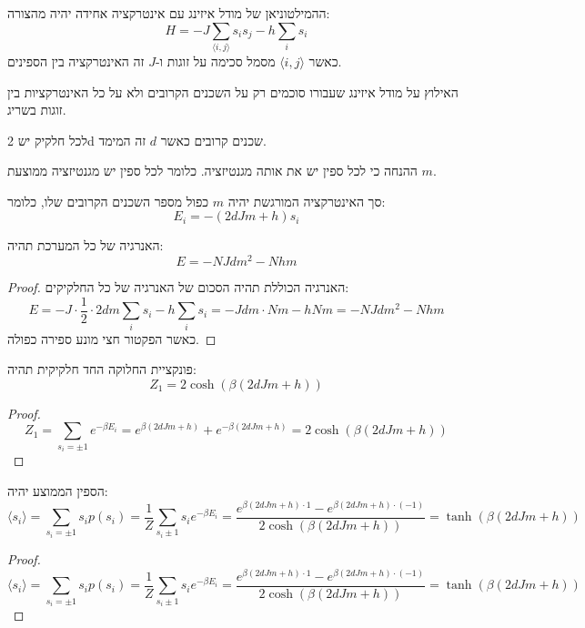 \documentclass{tstextbook}
\begin{document}
\begin{reminder}
ההמילטוניאן של מודל איזינג עם אינטרקציה אחידה יהיה מהצורה:
$$H=-J\sum_{\langle i,j\rangle}s_{i}s_{j}-h\sum_{i}s_{i}$$
כאשר \(\langle i,j \rangle\) מסמל סכימה על זוגות ו-\(J\) זה האינטרקציה בין הספינים.

\end{reminder}
\begin{definition}
האילוץ על מודל איזינג שעבורו סוכמים רק על השכנים הקרובים ולא על כל האינטרקציות בין זוגות בשריג.

\end{definition}
\begin{proposition}
לכל חלקיק יש 2d שכנים קרובים כאשר \(d\) זה המימד.

\end{proposition}
\begin{definition}
ההנחה כי לכל ספין יש את אותה מגנטיזציה. כלומר לכל ספין יש מגנטיזציה ממוצעת \(m\).

\end{definition}
\begin{proposition}
סך האינטרקציה המורגשת יהיה \(m\) כפול מספר השכנים הקרובים שלו, כלומר:
$$E_{i}=-\left(2d J m+h\right)s_{i}$$

\end{proposition}
\begin{proposition}
האנרגיה של כל המערכת תהיה:
$$E=-N J d m^{2}-N h m$$

\end{proposition}
\begin{proof}
האנרגיה הכוללת תהיה הסכום של האנרגיה של כל החלקיקים:
$$E=-J\cdot{\frac{1}{2}}\cdot2d m\sum_{i}s_{i}-h\sum_{i}s_{i}=-J d m\cdot N m-h N m=-N J d m^{2}-N h m$$
כאשר הפקטור חצי מונע ספירה כפולה.

\end{proof}
\begin{corollary}
פונקציית החלוקה החד חלקיקית תהיה:
$$Z_{1}=2\cosh\left(\beta\left(2d J m+h\right)\right)$$

\end{corollary}
\begin{proof}
$$Z_{1}=\sum_{s_{i}=\pm1}e^{-\beta E_{i}}=e^{\beta(2d J m+h)}+e^{-\beta(2d J m+h)}=2\cosh\left(\beta\left(2d J m+h\right)\right)$$

\end{proof}
\begin{corollary}
הספין הממוצע יהיה:
$$\langle s_{i}\rangle=\sum_{s_{i}=\pm1}s_{i}p\left(s_{i}\right)=\frac{1}{Z}\sum_{s_{i}\pm1}s_{i}e^{-\beta E_{i}}=\frac{e^{\beta\left(2d J m+h\right)\cdot1}-e^{\beta\left(2d J m+h\right)\cdot\left(-1\right)}}{2\cosh\left(\beta\left(2d J m+h\right)\right)}=\tanh\left(\beta\left(2d J m+h\right)\right)$$

\end{corollary}
\begin{proof}
$$\langle s_{i}\rangle=\sum_{s_{i}=\pm1}s_{i}p\left(s_{i}\right)=\frac{1}{Z}\sum_{s_{i}\pm1}s_{i}e^{-\beta E_{i}}=\frac{e^{\beta\left(2d J m+h\right)\cdot1}-e^{\beta\left(2d J m+h\right)\cdot\left(-1\right)}}{2\cosh\left(\beta\left(2d J m+h\right)\right)}=\tanh\left(\beta\left(2d J m+h\right)\right)$$

\end{proof}
\end{document}
